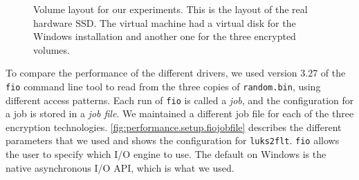 \begin{figure}[htb!]
	\caption[
		Volume layout for our experiments
	]{
		Volume layout for our experiments. This is the layout of the real hardware SSD. The virtual machine had a virtual disk for the Windows installation and another one for the three encrypted volumes.
	}
	\label{fig:performance.setup.disklayout}
\end{figure}

To compare the performance of the different drivers, we used version 3.27 of the \texttt{fio} command line tool \cite{Fio} to read from the three copies of \texttt{random.bin}, using different access patterns. Each run of \texttt{fio} is called a \emph{job}, and the configuration for a job is stored in a \emph{job file}. We maintained a different job file for each of the three encryption technologies. \autoref{fig:performance.setup.fiojobfile} describes the different parameters that we used and shows the configuration for \texttt{luks2flt}. \texttt{fio} allows the user to specify which I/O engine to use. The default on Windows is the native asynchronous I/O API, which is what we used.

